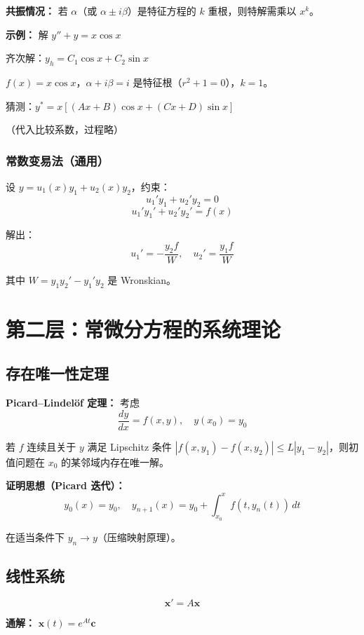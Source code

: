 \textbf{共振情况：} 若 $\alpha$（或 $\alpha \pm i\beta$）是特征方程的 $k$ 重根，则特解需乘以 $x^k$。

\textbf{示例：} 解 $y'' + y = x\cos x$

齐次解：$y_h = C_1\cos x + C_2\sin x$

$f(x) = x\cos x$，$\alpha + i\beta = i$ 是特征根（$r^2 + 1 = 0$），$k = 1$。

猜测：$y^* = x[(Ax + B)\cos x + (Cx + D)\sin x]$

（代入比较系数，过程略）

\subsubsection{常数变易法（通用）}

设 $y = u_1(x)y_1 + u_2(x)y_2$，约束：
\[
u_1' y_1 + u_2' y_2 = 0
\]
\[
u_1' y_1' + u_2' y_2' = f(x)
\]

解出：
\[
u_1' = -\frac{y_2 f}{W}, \quad u_2' = \frac{y_1 f}{W}
\]

其中 $W = y_1 y_2' - y_1' y_2$ 是 Wronskian。

\section{第二层：常微分方程的系统理论}

\subsection{存在唯一性定理}

\textbf{Picard--Lindelöf 定理：} 考虑
\[
\frac{dy}{dx} = f(x, y), \quad y(x_0) = y_0
\]

若 $f$ 连续且关于 $y$ 满足 Lipschitz 条件 $|f(x,y_1) - f(x,y_2)| \leq L|y_1 - y_2|$，则初值问题在 $x_0$ 的某邻域内存在唯一解。

\textbf{证明思想（Picard 迭代）：}
\[
y_0(x) = y_0, \quad y_{n+1}(x) = y_0 + \int_{x_0}^x f(t, y_n(t))\,dt
\]

在适当条件下 $y_n \to y$（压缩映射原理）。

\subsection{线性系统}

\[
\mathbf{x}' = A\mathbf{x}
\]

\textbf{通解：} $\mathbf{x}(t) = e^{At}\mathbf{c}$

